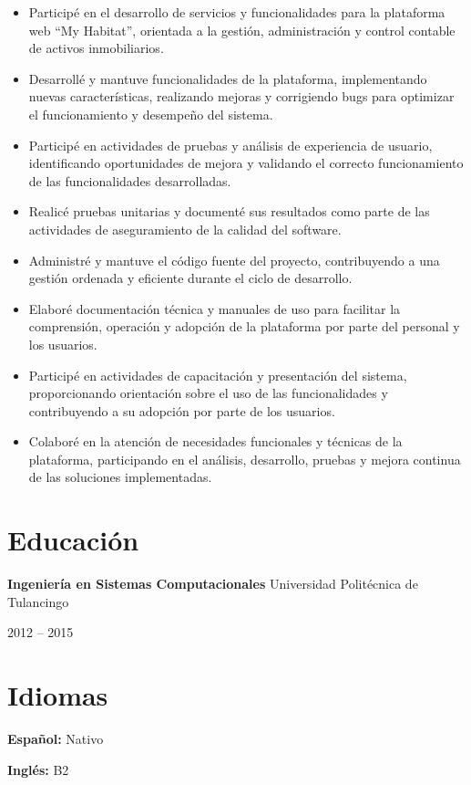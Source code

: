\documentclass[10pt,letterpaper]{article}
\newcommand{\jobdate}[1]{
    {\color{MediumGray} #1}
}
\begin{document}
\begin{itemize}

\item Participé en el desarrollo de servicios y funcionalidades para la plataforma web ``My Habitat'', orientada a la gestión, administración y control contable de activos inmobiliarios.

\item Desarrollé y mantuve funcionalidades de la plataforma, implementando nuevas características, realizando mejoras y corrigiendo bugs para optimizar el funcionamiento y desempeño del sistema.

\item Participé en actividades de pruebas y análisis de experiencia de usuario, identificando oportunidades de mejora y validando el correcto funcionamiento de las funcionalidades desarrolladas.

\item Realicé pruebas unitarias y documenté sus resultados como parte de las actividades de aseguramiento de la calidad del software.

\item Administré y mantuve el código fuente del proyecto, contribuyendo a una gestión ordenada y eficiente durante el ciclo de desarrollo.

\item Elaboré documentación técnica y manuales de uso para facilitar la comprensión, operación y adopción de la plataforma por parte del personal y los usuarios.

\item Participé en actividades de capacitación y presentación del sistema, proporcionando orientación sobre el uso de las funcionalidades y contribuyendo a su adopción por parte de los usuarios.

\item Colaboré en la atención de necesidades funcionales y técnicas de la plataforma, participando en el análisis, desarrollo, pruebas y mejora continua de las soluciones implementadas.

\end{itemize}

\section{Educación}

\textbf{Ingeniería en Sistemas Computacionales} \textbar{}
Universidad Politécnica de Tulancingo
\hfill
\jobdate{2012 -- 2015}


\section{Idiomas}

\textbf{Español:} Nativo

\textbf{Inglés:} B2
\end{document}
